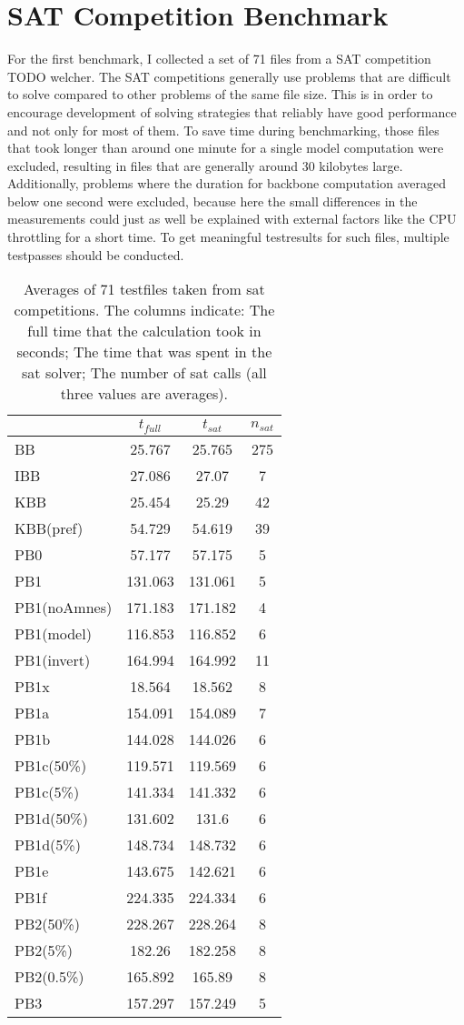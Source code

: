 \section{SAT Competition Benchmark}

For the first benchmark, I collected a set of 71 files from a SAT competition TODO welcher. The SAT competitions generally use problems that are difficult to solve compared to other problems of the same file size. This is in order to encourage development of solving strategies that reliably have good performance and not only for most of them. To save time during benchmarking, those files that took longer than around one minute for a single model computation were excluded, resulting in files that are generally around 30 kilobytes large. Additionally, problems where the duration for backbone computation averaged below one second were excluded, because here the small differences in the measurements could just as well be explained with external factors like the CPU throttling for a short time. To get meaningful testresults for such files, multiple testpasses should be conducted.

\begin{table} %
\label{tab:satCompAvg} %
\begin{tabular}{l| c c c }
 & $t_{full}$ & $t_{sat}$ & $n_{sat}$ \\
 \hline
BB & 25.767 & 25.765 & 275 \\
IBB & 27.086 & 27.07 & 7 \\
KBB & 25.454 & 25.29 & 42 \\
KBB(pref) & 54.729 & 54.619 & 39 \\
PB0 & 57.177 & 57.175 & 5 \\
PB1 & 131.063 & 131.061 & 5 \\
PB1(noAmnes) & 171.183 & 171.182 & 4 \\
PB1(model) & 116.853 & 116.852 & 6 \\
PB1(invert) & 164.994 & 164.992 & 11 \\
PB1x & 18.564 & 18.562 & 8 \\
PB1a & 154.091 & 154.089 & 7 \\
PB1b & 144.028 & 144.026 & 6 \\
PB1c(50\%) & 119.571 & 119.569 & 6 \\
PB1c(5\%) & 141.334 & 141.332 & 6 \\
PB1d(50\%) & 131.602 & 131.6 & 6 \\
PB1d(5\%) & 148.734 & 148.732 & 6 \\
PB1e & 143.675 & 142.621 & 6 \\
PB1f & 224.335 & 224.334 & 6 \\
PB2(50\%) & 228.267 & 228.264 & 8 \\
PB2(5\%) & 182.26 & 182.258 & 8 \\
PB2(0.5\%) & 165.892 & 165.89 & 8 \\
PB3 & 157.297 & 157.249 & 5
\end{tabular}
\caption{Averages of 71 testfiles taken from sat competitions. The columns indicate: The full time that the calculation took in seconds; The time that was spent in the sat solver; The number of sat calls (all three values are averages). }
\end{table}

